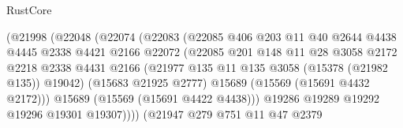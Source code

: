 \begin{lexlean}{RustCore}
\begin{coremodule}
                                  (@21998
                                    (@22048
                                      (@22074
                                        (@22083
                                          (@22085
                                            @406
                                            @203
                                            @11
                                            @40
                                            @2644
                                            @4438
                                            @4445
                                            @2338
                                            @4421
                                            @2166
                                            @22072
                                            (@22085
                                              @201
                                              @148
                                              @11
                                              @28
                                              @3058
                                              @2172
                                              @2218
                                              @2338
                                              @4431
                                              @2166
                                              (@21977
                                                @135
                                                @11
                                                @135
                                                @3058
                                                (@15378 (@21982 @135))
                                                @19042)
                                              (@15683 @21925 @2777)
                                              @15689
                                              (@15569 (@15691 @4432 @2172)))
                                            @15689
                                            (@15569 (@15691 @4422 @4438)))
                                          @19286
                                          @19289
                                          @19292
                                          @19296
                                          @19301
                                          @19307))))
                                  (@21947
                                    @279
                                    @751
                                    @11
                                    @47
                                    @2379

\end{coremodule}
\end{lexlean}
